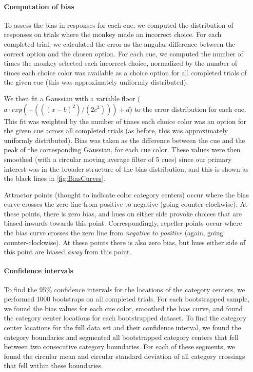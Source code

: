 
\paragraph{Computation of bias} To assess the bias in responses for each cue, we computed the distribution of responses on trials where the monkey made an incorrect choice.
For each completed trial, we calculated the error as the angular difference between the correct option and the chosen option.  
For each cue, we computed the number of times the monkey selected each incorrect choice, normalized by the number of times each choice color was available as a choice option for all completed trials of the given cue (this was approximately uniformly distributed).

We then fit a Gaussian with a variable floor ($a \cdot exp(-(((x-b)^2)/(2c^2)))+d$) to the error distribution for each cue. 
This fit was weighted by the number of times each choice color was an option for the given cue across all completed trials (as before, this was approximately uniformly distributed). 
Bias was taken as the difference between the cue and the peak of the corresponding Gaussian, for each cue color. These values were then smoothed (with a circular moving average filter of 5 cues) since our primary interest was in the broader structure of the bias distribution, and this is shown as the black lines in \autoref{fig:BiasCurves}.

Attractor points (thought to indicate color category centers) occur where the bias curve crosses the zero line from positive to negative (going counter-clockwise).
At these points, there is zero bias, and hues on either side provoke choices that are biased inwards towards this point.
Correspondingly, repeller points occur where the bias curve crosses the zero line from \emph{negative to positive} (again, going counter-clockwise).
At these points there is also zero bias, but hues either side of this point are biased \emph{away} from this point.

\paragraph{Confidence intervals}
To find the 95\% confidence intervals for the locations of the category centers, we performed 1000 bootstraps on all completed trials. For each bootstrapped sample, we found the bias values for each cue color, smoothed the bias curve, and found the category center locations for each bootstrapped dataset. To find the category center locations for the full data set and their confidence interval, we found the category boundaries and segmented all bootstrapped category centers that fell between two consecutive category boundaries. For each of these segments, we found the circular mean and circular standard deviation of all category crossings that fell within these boundaries. 

